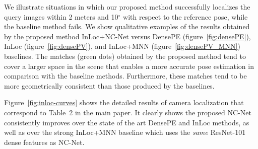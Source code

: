 \documentclass{article}
\begin{document}
We illustrate situations in which our proposed method successfully localizes the query images within 2 meters and 10$^\circ$ with respect to the reference pose, while the baseline method fails. We show qualitative examples of the results obtained by the proposed method InLoc+NC-Net versus 
DensePE (figure~\ref{fig:densePE}), InLoc (figure~\ref{fig:densePV}), 
and InLoc+MNN (figure~\ref{fig:densePV_MNN}) baselines.
The matches (green dots) obtained by the proposed method tend to cover a larger space in the scene that enables a more accurate pose estimation in comparison with the baseline methods. Furthermore, these matches tend to be more geometrically consistent than those produced by the baselines.

Figure~\ref{fig:inloc-curves} shows the detailed results of camera localization that correspond to Table~2 in the main paper. It clearly shows the proposed NC-Net consistently improves over the state of the art DensePE and InLoc methods, as well as over the strong InLoc+MNN baseline which uses the \emph{same} ResNet-101 dense features as NC-Net.
\end{document}
